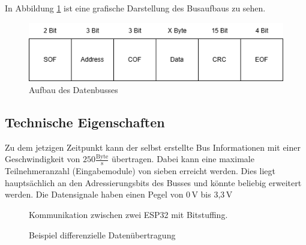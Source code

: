 In Abbildung \ref{Datenbus} ist eine grafische Darstellung des Busaufbaus zu sehen.
\begin{figure}[H]
	\centering    
	\includegraphics[width=1\textwidth]{Bilder/datenbus.png}
	\caption{Aufbau des Datenbusses}
	\label{Datenbus}
\end{figure}

\subsection{Technische Eigenschaften}
Zu dem jetzigen Zeitpunkt kann der selbst erstellte Bus Informationen mit einer Geschwindigkeit von $250\frac{\mathrm{Byte}}{\mathrm{s}}$ übertragen. Dabei kann eine maximale Teilnehmeranzahl (Eingabemodule) von sieben erreicht werden. Dies liegt hauptsächlich an den Adressierungsbits des Busses und könnte beliebig erweitert werden. Die Datensignale haben einen Pegel von 0\,\si{V} bis 3,3\,\si{V}

\begin{figure}[H]
    \centering    
    \caption{Kommunikation zwischen zwei ESP32 mit Bitstuffing.}
    \label{zeitplan}
\end{figure}

\begin{figure}[H]
    \centering    
    \caption{Beispiel differenzielle Datenübertragung}
    \label{beispielDatenübertragung}
\end{figure}

